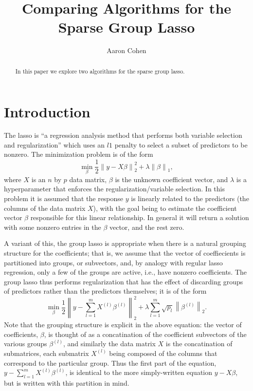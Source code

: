 \documentclass[titlepage]{article}
\title{Comparing Algorithms for the Sparse Group Lasso}
\author{Aaron Cohen}
\newcommand{\norm}[1]{\left\lVert #1 \right\rVert}
\begin{document}
    \maketitle
    \begin{abstract}
        In this paper we explore two algorithms for the sparse group lasso. 
    \end{abstract}

\section{Introduction}
\label{Sec:intro}
The lasso is ``a regression analysis method that performs both variable selection and regularization'' which uses an $l1$ penalty \citep{tibshirani1996regression} to select a subset of predictors to be nonzero. The minimization problem is of the form
\[
\min_{\beta} \frac{1}{2}\norm{y-X\beta}_2^2 + \lambda \norm{\beta}_1,
\]
where $X$ is an $n$ by $p$ data matrix, $\beta$ is the unknown coefficient vector, and $\lambda$ is a hyperparameter that enforces the regularization/variable selection. In this problem it is assumed that the response $y$ is linearly related to the predictors (the columns of the data matrix $X$), with the goal being to estimate the coefficient vector $\beta$ responsible for this linear relationship. In general it will return a solution with some nonzero entries in the $\beta$ vector, and the rest zero.

A variant of this, the group lasso \citep{yuan2006model} is appropriate when there is a natural grouping structure for the coefficients; that is, we assume that the vector of coeffiecients is partitioned into groups, or subvectors, and, by analogy with regular lasso regression, only a few of the groups are active, i.e., have nonzero coefficients. The group lasso thus performs regularization that has the effect of discarding groups of predictors rather than the predictors themselves; it is of the form 
\[
\min_{\beta}\frac{1}{2}\norm{y-\sum_{l=1}^mX^{(l)}\beta^{(l)}}_2^2 + \lambda\sum_{l=1}^m\sqrt{p_l}\norm{\beta^{(l)}}_2.
\]
Note that the grouping structure is explicit in the above equation: the vector of coefficients, $\beta$, is thought of as a concatination of the coefficient subvectors of the various groups $\beta^{(l)}$, and similarly the data matrix $X$ is the concatination of submatrices, each submatrix $X^{(l)}$ being composed of the columns that correspond to the particular group. Thus the first part of the equation, $y-\sum_{l=1}^mX^{(l)}\beta^{(l)}$, is identical to the more simply-written equation $y-X\beta$, but is written with this partition in mind. 
\end{document}

